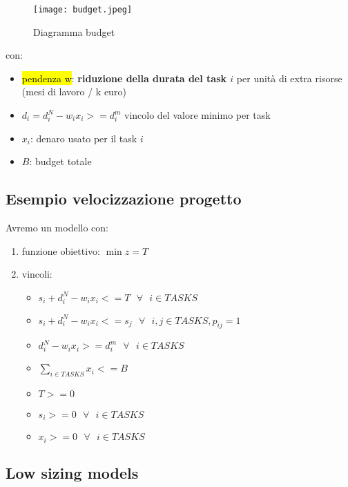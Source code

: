 \begin{figure}[H]
\centering
\texttt{[image: budget.jpeg]}
\caption{Diagramma budget} 
\label{budget}
\end{figure}


con:

\begin{itemize}
	\item \hl{pendenza w}: \textbf{riduzione della durata del task $i$} per unità di extra risorse (mesi di lavoro / k euro)
	\item $d_i = d_i^N - w_i x_i >= d_i^m$ vincolo del valore minimo per task
	\item $x_i$: denaro usato per il task $i$
	\item $B$: budget totale

\end{itemize}


\subsection{Esempio velocizzazione progetto}

Avremo un modello con:

\begin{enumerate}
	\item funzione obiettivo: $\min z = T$
	\item vincoli:
		
		\begin{itemize}
			\item $s_i + d_i^N - w_i x_i <= T\ \ \ \forall\ \ \ i \in TASKS$
			\item $s_i + d_i^N - w_i x_i <= s_j\ \ \ \forall\ \ \ i, j \in TASKS, p_{ij} = 1$
			\item $d_i^N - w_i x_i >= d_i^m\ \ \ \forall\ \ \ i \in TASKS$
			\item $\sum_{i \in TASKS} x_i <= B$
			\item $T >= 0$
			\item $s_i >= 0\ \ \ \forall\ \ \ i \in TASKS$
			\item $x_i >= 0\ \ \ \forall\ \ \ i \in TASKS$
		\end{itemize}
\end{enumerate}


\subsection{Low sizing models}

